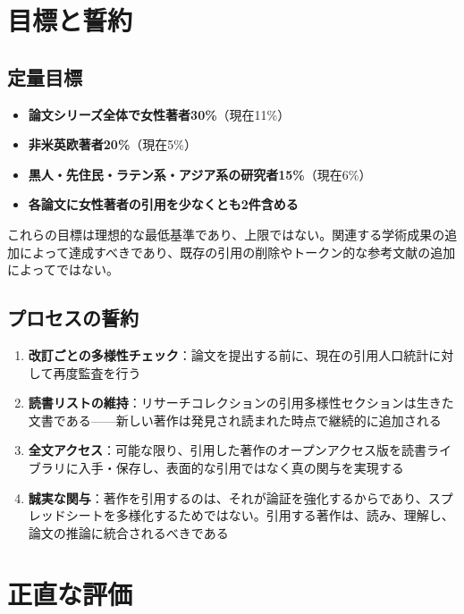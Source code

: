 \documentclass[10pt,letterpaper,twocolumn]{article}
\begin{document}

\section{目標と誓約}

\subsection{定量目標}

\begin{itemize}
  \item \textbf{論文シリーズ全体で女性著者30\%}（現在11\%）
  \item \textbf{非米英欧著者20\%}（現在5\%）
  \item \textbf{黒人・先住民・ラテン系・アジア系の研究者15\%}（現在6\%）
  \item \textbf{各論文に女性著者の引用を少なくとも2件含める}
\end{itemize}

これらの目標は理想的な最低基準であり、上限ではない。関連する学術成果の追加によって達成すべきであり、既存の引用の削除やトークン的な参考文献の追加によってではない。

\subsection{プロセスの誓約}

\begin{enumerate}
  \item \textbf{改訂ごとの多様性チェック}：論文を提出する前に、現在の引用人口統計に対して再度監査を行う
  \item \textbf{読書リストの維持}：リサーチコレクションの引用多様性セクションは生きた文書である——新しい著作は発見され読まれた時点で継続的に追加される
  \item \textbf{全文アクセス}：可能な限り、引用した著作のオープンアクセス版を読書ライブラリに入手・保存し、表面的な引用ではなく真の関与を実現する
  \item \textbf{誠実な関与}：著作を引用するのは、それが論証を強化するからであり、スプレッドシートを多様化するためではない。引用する著作は、読み、理解し、論文の推論に統合されるべきである
\end{enumerate}


\section{正直な評価}
\end{document}
